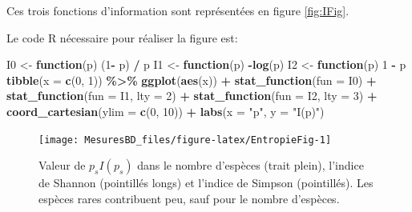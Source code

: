\documentclass[
  11pt,
  american,
  a4paper,
  extrafontsizes,onecolumn,openright
  ]{memoir}
\newenvironment{Shaded}{\begin{snugshade}}{\end{snugshade}}
\newcommand{\AttributeTok}[1]{\textcolor[rgb]{0.13,0.29,0.53}{#1}}
\newcommand{\ControlFlowTok}[1]{\textcolor[rgb]{0.13,0.29,0.53}{\textbf{#1}}}
\newcommand{\DecValTok}[1]{\textcolor[rgb]{0.00,0.00,0.81}{#1}}
\newcommand{\FunctionTok}[1]{\textcolor[rgb]{0.13,0.29,0.53}{\textbf{#1}}}
\newcommand{\NormalTok}[1]{#1}
\newcommand{\OtherTok}[1]{\textcolor[rgb]{0.56,0.35,0.01}{#1}}
\newcommand{\SpecialCharTok}[1]{\textcolor[rgb]{0.81,0.36,0.00}{\textbf{#1}}}
\newcommand{\StringTok}[1]{\textcolor[rgb]{0.31,0.60,0.02}{#1}}
\begin{document}
\normalsize

Ces trois fonctions d'information sont représentées en figure \ref{fig:IFig}.

Le code R nécessaire pour réaliser la figure est:

\scriptsize

\begin{Shaded}
\begin{Highlighting}[]
\NormalTok{I0 }\OtherTok{\textless{}{-}} \ControlFlowTok{function}\NormalTok{(p) (}\DecValTok{1}\SpecialCharTok{{-}}\NormalTok{ p) }\SpecialCharTok{/}\NormalTok{ p}
\NormalTok{I1 }\OtherTok{\textless{}{-}} \ControlFlowTok{function}\NormalTok{(p) }\SpecialCharTok{{-}}\FunctionTok{log}\NormalTok{(p)}
\NormalTok{I2 }\OtherTok{\textless{}{-}} \ControlFlowTok{function}\NormalTok{(p) }\DecValTok{1} \SpecialCharTok{{-}}\NormalTok{ p}
\FunctionTok{tibble}\NormalTok{(}\AttributeTok{x =} \FunctionTok{c}\NormalTok{(}\DecValTok{0}\NormalTok{, }\DecValTok{1}\NormalTok{)) }\SpecialCharTok{\%\textgreater{}\%} 
  \FunctionTok{ggplot}\NormalTok{(}\FunctionTok{aes}\NormalTok{(x)) }\SpecialCharTok{+} 
    \FunctionTok{stat\_function}\NormalTok{(}\AttributeTok{fun =}\NormalTok{ I0) }\SpecialCharTok{+}
    \FunctionTok{stat\_function}\NormalTok{(}\AttributeTok{fun =}\NormalTok{ I1, }\AttributeTok{lty =} \DecValTok{2}\NormalTok{) }\SpecialCharTok{+}
    \FunctionTok{stat\_function}\NormalTok{(}\AttributeTok{fun =}\NormalTok{ I2, }\AttributeTok{lty =} \DecValTok{3}\NormalTok{) }\SpecialCharTok{+}
    \FunctionTok{coord\_cartesian}\NormalTok{(}\AttributeTok{ylim =} \FunctionTok{c}\NormalTok{(}\DecValTok{0}\NormalTok{, }\DecValTok{10}\NormalTok{)) }\SpecialCharTok{+}
    \FunctionTok{labs}\NormalTok{(}\AttributeTok{x =} \StringTok{"p"}\NormalTok{, }\AttributeTok{y =} \StringTok{"I(p)"}\NormalTok{)}
\end{Highlighting}
\end{Shaded}

\normalsize



\scriptsize

\begin{figure}

{\centering \texttt{[image: MesuresBD\_files/figure-latex/EntropieFig-1]} 

}

\caption{Valeur de \(p_{s}I(p_s)\) dans le nombre d'espèces (trait plein), l'indice de Shannon (pointillés longs) et l'indice de Simpson (pointillés). Les espèces rares contribuent peu, sauf pour le nombre d'espèces.}\label{fig:EntropieFig}
\end{figure}
\end{document}
